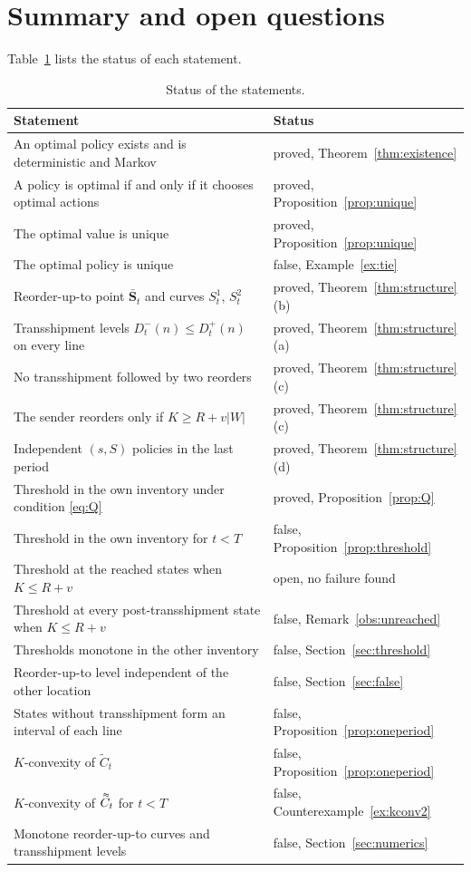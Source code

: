 \documentclass[11pt]{article}
\DeclareRobustCommand{\dbtilde}[1]{\accentset{\approx}{#1}}
\renewcommand{\vec}[1]{\boldsymbol{#1}}
\newcommand{\Ct}{\widetilde{C}}
\newcommand{\Cq}{\dbtilde{C}}
\theoremstyle{definition}
\begin{document}
\section{Summary and open questions}\label{sec:summary}

Table~\ref{tab:status} lists the status of each statement.

\begin{table}[h]
\centering
\small
\caption{Status of the statements.}\label{tab:status}
\begin{tabular}{p{9.3cm}l}
\toprule
Statement & Status \\
\midrule
An optimal policy exists and is deterministic and Markov & proved, Theorem~\ref{thm:existence} \\
A policy is optimal if and only if it chooses optimal actions & proved, Proposition~\ref{prop:unique} \\
The optimal value is unique & proved, Proposition~\ref{prop:unique} \\
The optimal policy is unique & false, Example~\ref{ex:tie} \\
Reorder-up-to point $\bar{\vec{S}}_t$ and curves $S^1_t$, $S^2_t$ & proved, Theorem~\ref{thm:structure}(b) \\
Transshipment levels $D^-_t(n)\le D^+_t(n)$ on every line & proved, Theorem~\ref{thm:structure}(a) \\
No transshipment followed by two reorders & proved, Theorem~\ref{thm:structure}(c) \\
The sender reorders only if $K\ge R+v|W|$ & proved, Theorem~\ref{thm:structure}(c) \\
Independent $(s,S)$ policies in the last period & proved, Theorem~\ref{thm:structure}(d) \\
Threshold in the own inventory under condition \eqref{eq:Q} & proved, Proposition~\ref{prop:Q} \\
Threshold in the own inventory for $t<T$ & false, Proposition~\ref{prop:threshold} \\
Threshold at the reached states when $K\le R+v$ & open, no failure found \\
Threshold at every post-transshipment state when $K\le R+v$ & false, Remark~\ref{obs:unreached} \\
Thresholds monotone in the other inventory & false, Section~\ref{sec:threshold} \\
Reorder-up-to level independent of the other location & false, Section~\ref{sec:false} \\
States without transshipment form an interval of each line & false, Proposition~\ref{prop:oneperiod} \\
$K$-convexity of $\Ct_t$ & false, Proposition~\ref{prop:oneperiod} \\
$K$-convexity of $\Cq_t$ for $t<T$ & false, Counterexample~\ref{ex:kconv2} \\
Monotone reorder-up-to curves and transshipment levels & false, Section~\ref{sec:numerics} \\
\bottomrule
\end{tabular}
\end{table}
\end{document}
